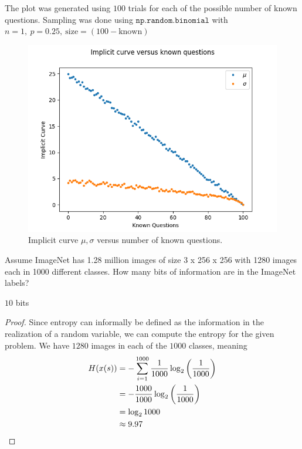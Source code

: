 \documentclass[11pt]{article}
\begin{document}
\begin{solution}
	The plot was generated using $100$ trials for each of the possible number
	of known questions. Sampling was done using $\texttt{np.random.binomial}$
	with $n=1,\ p=0.25,\ \text{size}=(100 - \text{known})$
	\begin{figure}[H]
		\centering
		\includegraphics[width=0.8\linewidth]{figures/q4.png}
		\caption{Implicit curve $\mu, \sigma$ versus number of known questions.}
	\end{figure}

\end{solution}


Assume ImageNet has 1.28 million images of size 3 x 256 x 256 with 1280 images
each in 1000 different classes. How many bits of information are in the ImageNet
labels?

\begin{solution}
	$10$ bits
\end{solution}

\begin{proof}
	Since entropy can informally be defined as the information in the
	realization of a random variable, we can compute the entropy for the given
	problem. We have $1280$ images in each of the $1000$ classes, meaning
	\begin{align}
		H(x(s)) &= -\sum\limits_{i=1}^{1000} \frac{1}{1000}\log_2\left(
			\frac{1}{1000}\right)
		\\
		&= -\frac{1000}{1000} \log_2\left(\frac{1}{1000}\right)
		\\
		&= \log_2 1000
		\\
		&\approx 9.97
	\end{align}
\end{proof}
\end{document}
